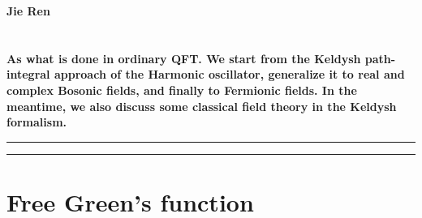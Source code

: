 \documentclass{SciPost}
\begin{document}
\pagestyle{SPstyle}

\begin{center}{\Large \textbf{\color{scipostdeepblue}{
Keldysh Field Theory\\
}}}\end{center}

\begin{center}
\textbf{Jie Ren}
\end{center}

\section*{\color{scipostdeepblue}{Abstract}}
\boldmath\textbf{%
As what is done in ordinary QFT. We start from the Keldysh path-integral approach of the Harmonic oscillator, generalize it to real and complex Bosonic fields, and finally to Fermionic fields. In the meantime, we also discuss some classical field theory in the Keldysh formalism.
}


\noindent\rule{\textwidth}{1pt}
\tableofcontents
\noindent\rule{\textwidth}{1pt}


\section{Free Green's function}
\end{document}
